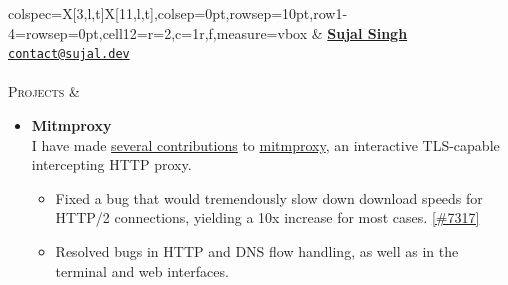 \documentclass[11pt]{article}
\begin{document}
    \noindent%
    \begin{tblr}%
    {colspec={X[3,l,t]X[11,l,t]},colsep=0pt,rowsep=10pt,row{1-4}={rowsep=0pt},cell{1}{2}={r=2,c=1}{r,f},measure=vbox}%
        \href{https://github.com/sujaldev}{\faGithub}
        \hspace{5pt} \href{https://linkedin.com/in/sujal-singh}{\faLinkedin}
        \hspace{5pt} \href{https://youtube.com/@sujaldev}{\faYoutube}
        &
        \href{https://sujal.dev/}{\textbf{\huge Sujal Singh}}
        \\
        \href{mailto:contact@sujal.dev}{\texttt{contact@sujal.dev}}
        \\ \\
        \textsc{\large Projects} &
        \vspace*{-1.5\topsep}
        \begin{itemize}[topsep=0pt,leftmargin=15pt]
            \item \textbf{Mitmproxy}\\
            I have made
            \href{https://github.com/mitmproxy/mitmproxy/commits?author=sujaldev}{\color{blue}several contributions} to
            \href{https://github.com/mitmproxy/mitmproxy}{\color{blue}mitmproxy}, an
            interactive TLS-capable intercepting HTTP proxy.
            \begin{itemize}[nosep,left=0pt..1em]
                \item Fixed a bug that would tremendously slow down download speeds for HTTP/2 connections, yielding
                a 10x increase for most cases.
                \href{https://github.com/mitmproxy/mitmproxy/pull/7317}{\color{blue}[\#7317]}
                \item Resolved bugs in HTTP and DNS flow handling, as well as in the terminal and web interfaces.
            \end{itemize}


\end{itemize}
\end{tblr}
\end{document}
